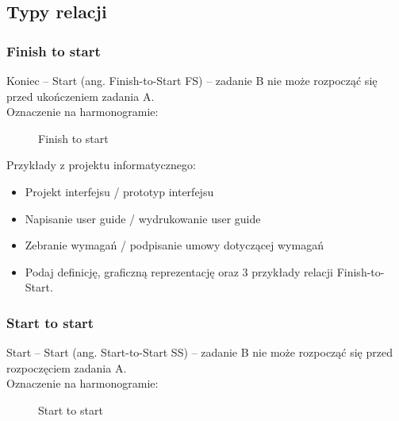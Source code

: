 \documentclass[a4paper,15pt]{article}
\begin{document}
\subsection{Typy relacji}
\subsubsection{Finish to start}
Koniec – Start (ang. Finish-to-Start FS) – zadanie B nie może rozpocząć się przed ukończeniem zadania A. \\
Oznaczenie na harmonogramie:


\begin{figure}[H]
    \centering
    \qquad
    \caption{Finish to start}%
    \label{fig:example}%
\end{figure}


Przykłady z projektu informatycznego:
\begin{itemize}
\item Projekt interfejsu / prototyp interfejsu
\item Napisanie user guide / wydrukowanie user guide
\item Zebranie wymagań / podpisanie umowy dotyczącej wymagań
\end{itemize}


\begin{framed}
\begin{itemize}
\item Podaj definicję, graficzną reprezentację oraz 3 przykłady relacji Finish-to-Start.
\end{itemize}
\end{framed}



\newpage
\subsubsection{Start to start}
Start – Start (ang. Start-to-Start SS) – zadanie B nie może rozpocząć się przed rozpoczęciem zadania A. \\
Oznaczenie na harmonogramie:

\begin{figure}[H]
    \centering
    \qquad
    \caption{Start to start}%
    \label{fig:example}%
\end{figure}
\end{document}
